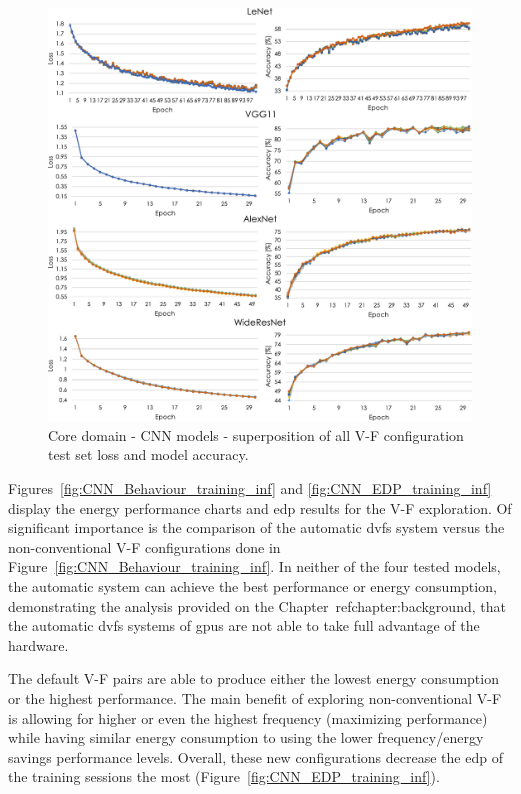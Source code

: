 \begin{figure}[htb]
    \centering
        \includegraphics[width=\textwidth]{Figures/Application To Deep Learning/CNN_loss_acc.pdf}
        \caption{Core domain - CNN models - superposition of all V-F configuration test set loss and model accuracy.}
    \label{fig:CNN_loss}
\end{figure}

Figures~\ref{fig:CNN_Behaviour_training_inf} and \ref{fig:CNN_EDP_training_inf} display the energy performance charts and \acrshort{edp} results for the V-F exploration. Of significant importance is the comparison of the automatic  \acrshort{dvfs} system versus the non-conventional V-F configurations done in Figure~\ref{fig:CNN_Behaviour_training_inf}. In neither of the four tested models, the automatic system can achieve the best performance or energy consumption, demonstrating the analysis provided on the Chapter~ref{chapter:background}, that the automatic \acrshort{dvfs} systems of \acrshort{gpu}s are not able to take full advantage of the hardware. 

The default V-F pairs are able to produce either the lowest energy consumption or the highest performance. 
The main benefit of exploring non-conventional V-F is allowing for higher or even the highest frequency (maximizing performance) while having similar energy consumption to using the lower frequency/energy savings performance levels.
Overall, these new configurations decrease the \acrshort{edp} of the training sessions the most (Figure~\ref{fig:CNN_EDP_training_inf}).



